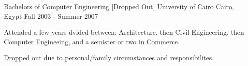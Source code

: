 

\begin{cventries}

	\cventry
	{Bachelors of Computer Engineering [Dropped Out]} %
	{University of Cairo} %
	{Cairo, Egypt} %
	{Fall 2003 - Summer 2007} %
	{
		\begin{cvitems} %
			\item {Attended a few years dvided between: Architecture, then Civil Engineering, then Computer Engineeing, and
			            a semister or two in Commerce.}
			\item{Dropped out due to personal/family circumstances and responsibilites.}
		\end{cvitems}
	}
\end{cventries}
